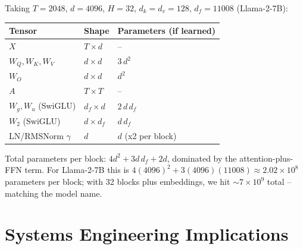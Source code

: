 Taking $T = 2048$, $d = 4096$, $H = 32$, $d_k = d_v = 128$,
$d_f = 11008$ (Llama-2-7B):
\begin{center}
\begin{tabular}{|l|l|l|}
\hline
Tensor & Shape & Parameters (if learned) \\
\hline
$X$                    & $T \times d$        & -- \\
$W_Q, W_K, W_V$        & $d \times d$        & $3\,d^2$ \\
$W_O$                  & $d \times d$        & $d^2$ \\
$A$                    & $T \times T$        & -- \\
$W_g, W_u$ (SwiGLU)    & $d_f \times d$      & $2\,d\,d_f$ \\
$W_2$ (SwiGLU)         & $d \times d_f$      & $d\,d_f$ \\
LN/RMSNorm $\gamma$    & $d$                 & $d$ (x2 per block) \\
\hline
\end{tabular}
\end{center}

Total parameters per block: $4d^2 + 3 d\, d_f + 2d$, dominated by the
attention-plus-FFN term. For Llama-2-7B this is
$4 (4096)^2 + 3 (4096)(11008) \approx 2.02 \times 10^{8}$ parameters
per block; with 32 blocks plus embeddings, we hit $\sim\!7\times 10^9$
total -- matching the model name.

\section{Systems Engineering Implications}

